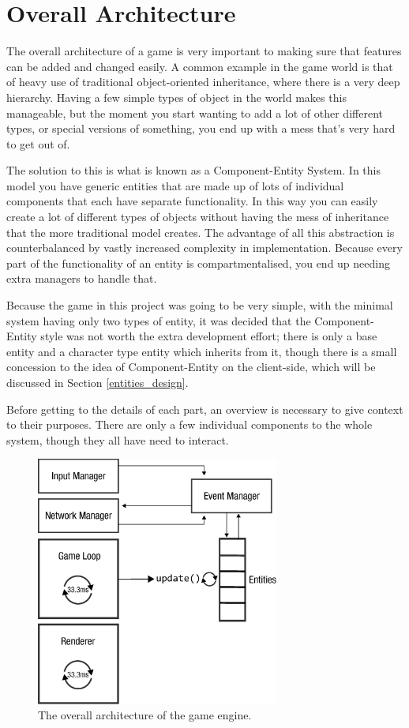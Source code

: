 \section{Overall Architecture}
The overall architecture of a game is very important to making sure that features can be added and changed easily. A common example in the game world is that of heavy use of traditional object-oriented inheritance, where there is a very deep hierarchy. Having a few simple types of object in the world makes this manageable, but the moment you start wanting to add a lot of other different types, or special versions of something, you end up with a mess that's very hard to get out of.

The solution to this is what is known as a Component-Entity System. In this model you have generic entities that are made up of lots of individual components that each have separate functionality. In this way you can easily create a lot of different types of objects without having the mess of inheritance that the more traditional model creates. The advantage of all this abstraction is counterbalanced by vastly increased complexity in implementation. Because every part of the functionality of an entity is compartmentalised, you end up needing extra managers to handle that.

Because the game in this project was going to be very simple, with the minimal system having only two types of entity, it was decided that the Component-Entity style was not worth the extra development effort; there is only a base entity and a character type entity which inherits from it, though there is a small concession to the idea of Component-Entity on the client-side, which will be discussed in Section \ref{entities_design}.

Before getting to the details of each part, an overview is necessary to give context to their purposes. There are only a few individual components to the whole system, though they all have need to interact.

\begin{figure}
	\centering
	\includegraphics[width=8cm]{Images/overall_architecture.eps}
	\caption{The overall architecture of the game engine.}
    \label{fig:architecture}
\end{figure}

